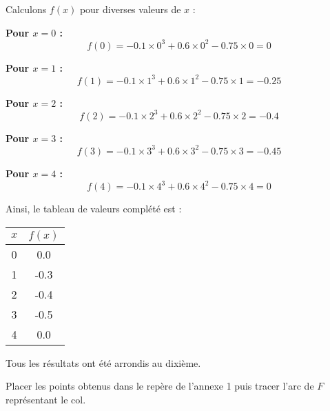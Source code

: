 \documentclass[answers]{exam}
\begin{document}
\begin{questions}
\begin{solution}
Calculons $f(x)$ pour diverses valeurs de $x$ :


    \item \textbf{Pour $x = 0$ :} 
    \[
    f(0) = -0.1 \times 0^3 + 0.6 \times 0^2 - 0.75 \times 0 = 0
    \]

    \item \textbf{Pour $x = 1$ :} 
    \[
    f(1) = -0.1 \times 1^3 + 0.6 \times 1^2 - 0.75 \times 1 = -0.25
    \]

    \item \textbf{Pour $x = 2$ :} 
    \[
    f(2) = -0.1 \times 2^3 + 0.6 \times 2^2 - 0.75 \times 2 = -0.4
    \]

    \item \textbf{Pour $x = 3$ :} 
    \[
    f(3) = -0.1 \times 3^3 + 0.6 \times 3^2 - 0.75 \times 3 = -0.45
    \]

    \item \textbf{Pour $x = 4$ :} 
    \[
    f(4) = -0.1 \times 4^3 + 0.6 \times 4^2 - 0.75 \times 4 = 0
    \]


Ainsi, le tableau de valeurs complété est :
\begin{table}[H]
\centering
\begin{tabular}{|c|c|}
\hline
$x$ & $f(x)$ \\
\hline
0 & 0.0 \\
1 & -0.3 \\
2 & -0.4 \\
3 & -0.5 \\
4 & 0.0 \\
\hline
\end{tabular}
\end{table}

Tous les résultats ont été arrondis au dixième.
\end{solution}

\question[2] Placer les points obtenus dans le repère de l’annexe 1 puis tracer l’arc de $F$ représentant le col.
  
\end{questions}
\end{document}
